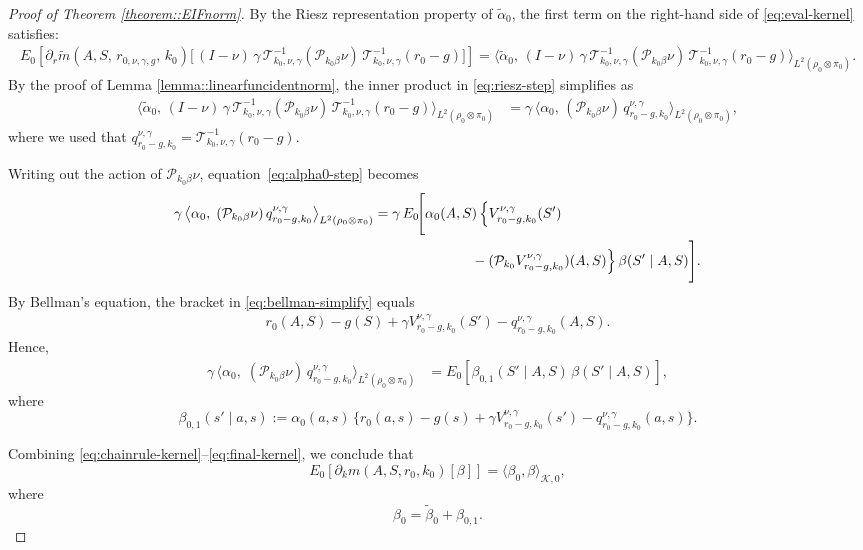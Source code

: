 \documentclass[11pt]{article}
\theoremstyle{plain}
\begin{document}
\begin{proof}[Proof of Theorem \ref{theorem::EIFnorm}]
By the Riesz representation property of $\tilde{\alpha}_0$, the first term on the right-hand side of \eqref{eq:eval-kernel} satisfies:
\begin{align}
    E_0\!\left[\partial_r \tilde{m}\!\left(A,S,\,r_{0,\nu,\gamma,g},\,k_0\right)
      \bigl[\,(I-\nu)\,\gamma\,\mathcal{T}^{-1}_{k_0,\nu,\gamma}(\mathcal{P}_{k_0\beta}\nu)\,\mathcal{T}^{-1}_{k_0,\nu,\gamma}(r_0-g)\bigr]\right]
    = \langle \tilde{\alpha}_0, \, (I-\nu)\,\gamma\,\mathcal{T}^{-1}_{k_0,\nu,\gamma}(\mathcal{P}_{k_0\beta}\nu)\,\mathcal{T}^{-1}_{k_0,\nu,\gamma}(r_0-g)\rangle_{L^2(\rho_0 \otimes \pi_0)}.
\label{eq:riesz-step}
\end{align}
By the proof of Lemma \ref{lemma::linearfuncidentnorm}, the inner product in \eqref{eq:riesz-step} simplifies as
\begin{align}
\big\langle \tilde{\alpha}_0,\,(I-\nu)\,\gamma\,\mathcal{T}^{-1}_{k_0,\nu,\gamma}(\mathcal{P}_{k_0\beta}\nu)\,
     \mathcal{T}^{-1}_{k_0,\nu,\gamma}(r_0-g)\big\rangle_{L^2(\rho_0 \otimes \pi_0)} 
&= \gamma\,\big\langle \alpha_0,\,(\mathcal{P}_{k_0\beta}\nu)\,q_{r_0-g, k_0}^{\nu, \gamma} \big\rangle_{L^2(\rho_0 \otimes \pi_0)} ,
\label{eq:alpha0-step}
\end{align}
where we used that $q_{r_0-g, k_0}^{\nu, \gamma} =  \mathcal{T}^{-1}_{k_0,\nu,\gamma}(r_0-g)$.

Writing out the action of $\mathcal{P}_{k_0\beta}\nu$, equation~\eqref{eq:alpha0-step} becomes
\begin{align}
\gamma\,\big\langle \alpha_0,\;(\mathcal{P}_{k_0\beta}\nu)\,
     q_{r_0-g, k_0}^{\nu, \gamma}\big\rangle_{L^2(\rho_0 \otimes \pi_0)}
&= \gamma\,E_0\!\Bigg[ 
     \alpha_0(A,S)\,
     \Big\{V_{r_0-g, k_0}^{\nu, \gamma}(S') \notag\\
&\qquad\qquad\qquad\quad
     - (\mathcal{P}_{k_0}V_{r_0-g, k_0}^{\nu, \gamma})(A,S)\Big\}
     \,\beta(S' \mid A,S) \Bigg].
\label{eq:bellman-simplify}
\end{align}
By Bellman’s equation, the bracket in \eqref{eq:bellman-simplify} equals
\begin{align}
    r_0(A,S) - g(S) +  \gamma V_{r_0-g, k_0}^{\nu, \gamma}(S') -  q_{r_0-g, k_0}^{\nu, \gamma}(A,S).
\label{eq:bellman-id}
\end{align}
Hence, 
\begin{align}
   \gamma\,\big\langle \alpha_0,\;(\mathcal{P}_{k_0\beta}\nu)\,
     q_{r_0-g, k_0}^{\nu, \gamma}\big\rangle_{L^2(\rho_0 \otimes \pi_0)} 
   &= E_0\!\left[ 
     \beta_{0,1}(S' \mid A,S)\,
     \beta(S' \mid A,S) \right],
\label{eq:final-kernel}
\end{align}
where
\[
  \beta_{0,1}(s' \mid a,s)
  := \alpha_0(a,s)\,
     \Big\{r_0(a,s) - g(s) + \gamma V_{r_0-g, k_0}^{\nu, \gamma}(s')
        - q_{r_0-g, k_0}^{\nu, \gamma}(a,s)\Big\}.
\]

Combining \eqref{eq:chainrule-kernel}–\eqref{eq:final-kernel}, we conclude that
\[
E_0[\partial_k m(A,S,r_0,k_0)[\beta]] =  \langle \beta_0, \beta \rangle_{\mathcal{K}, 0},
\]
where
\[
\beta_0 = \tilde \beta_0 + \beta_{0,1}.
\]




\end{proof}
\end{document}
